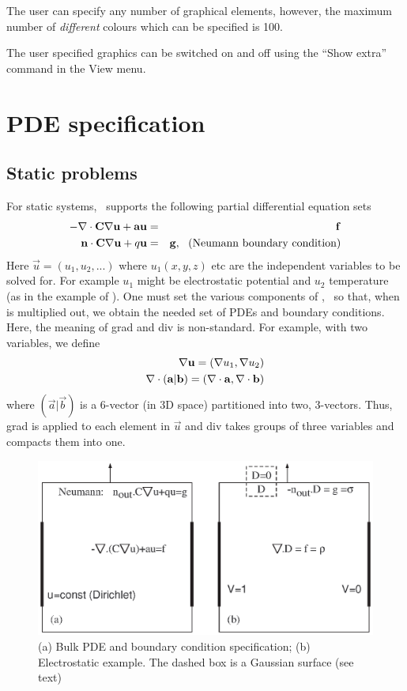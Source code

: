 \documentclass[a4paper,twoside,11pt]{book}
\begin{document}
The user can specify any number of graphical elements, however, the
maximum number of \emph{different} colours which can be specified is 100.

The user specified graphics can be switched on and off using the
``Show extra'' command in the View menu.

\chapter{PDE specification}

\section{Static problems}
\label{pdestatic}

For static systems, \zinc\ supports the following partial differential
equation sets
\begin{eqnarray}
  -\nabla\cdot \mathbf{C}\nabla\mathbf{u}+\mathbf{a}\mathbf{u}&=&\mathbf{f} \label{voleq}\\
  \mathbf{n}\cdot \mathbf{C}\nabla\mathbf{u}+q\mathbf{u}&=&\mathbf{g},~~ \mathrm{(Neumann~boundary~condition)} \label{neu}
\end{eqnarray}
Here $\vec u=(u_1,u_2,...)$ where $u_1(x,y,z)$ etc are the independent
variables to be solved for. For example $u_1$ might be electrostatic
potential and $u_2$ temperature (as in the example of
). One must set the various components of \caf, \qg\ so that,
when  is multiplied out, we obtain the needed set of PDEs
and boundary conditions. Here, the meaning of grad and div is
non-standard. For example, with two variables, we define
\begin{eqnarray}
  \nabla\mathbf{u} = (\nabla u_1,\nabla u_2)\\
  \nabla\cdot (\mathbf{a} | \mathbf{b})=(\nabla\cdot\mathbf{a}, \nabla\cdot\mathbf{b})
\end{eqnarray}
where $(\vec a | \vec b)$ is a 6-vector (in 3D space) partitioned into
two, 3-vectors. Thus, grad is applied to each element in $\vec u$ and
div takes groups of three variables and compacts them into one.

\begin{figure}
  \includegraphics{Dboundary}
  \caption{(a) Bulk PDE and boundary condition specification; (b)
    Electrostatic example. The dashed box is a Gaussian surface (see
    text)}
  \label{Dboundary}
\end{figure}
\end{document}
